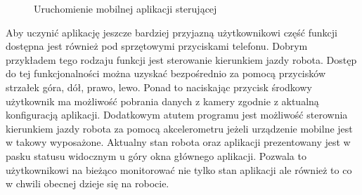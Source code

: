  \begin{figure}[h!]
 \centering
 \caption{Uruchomienie mobilnej aplikacji sterującej}
 \label{fig:wm-run}
\end{figure}

Aby uczynić aplikację jeszcze bardziej przyjazną użytkownikowi część funkcji
dostępna jest również pod sprzętowymi przyciskami telefonu. Dobrym przykładem
tego rodzaju funkcji jest sterowanie kierunkiem jazdy robota. Dostęp do tej
funkcjonalności można uzyskać bezpośrednio za pomocą przycisków strzałek
góra, dół, prawo, lewo. Ponad to naciskając przycisk środkowy użytkownik ma
możliwość pobrania danych z kamery zgodnie z aktualną konfiguracją aplikacji.
Dodatkowym atutem programu jest możliwość sterownia kierunkiem jazdy robota za
pomocą akcelerometru jeżeli urządzenie mobilne jest w takowy wyposażone.
Aktualny stan robota oraz aplikacji prezentowany jest w pasku statusu widocznym
u góry okna głównego aplikacji. Pozwala to użytkownikowi na bieżąco monitorować
nie tylko stan aplikacji ale również to co w chwili obecnej dzieje się na
robocie.